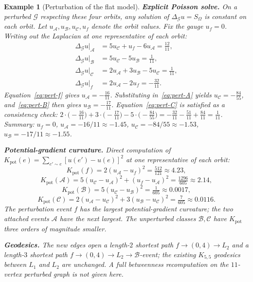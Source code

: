 \documentclass[12pt]{article}
\newtheorem{example}[theorem]{Example}
\newcommand{\Gcal}{\mathcal{G}}
\begin{document}
\begin{example}[Perturbation of the flat model]
\textbf{Explicit Poisson solve.} On a perturbed $\Gcal$ respecting these four orbits, any solution of $\Delta_\Gcal u = S_\Omega$ is constant on each orbit. Let $u_\mathcal{A}, u_\mathcal{B}, u_\mathcal{C}, u_f$ denote the orbit values. Fix the gauge $u_f = 0$. Writing out the Laplacian at one representative of each orbit:
\begin{align}
    \Delta_\Gcal u \big|_{\mathcal{A}} &= 5 u_\mathcal{C} + u_f - 6 u_\mathcal{A} = \tfrac{12}{11}, \label{eq:pert-A}\\
    \Delta_\Gcal u \big|_{\mathcal{B}} &= 5 u_\mathcal{C} - 5 u_\mathcal{B} = \tfrac{1}{11}, \label{eq:pert-B}\\
    \Delta_\Gcal u \big|_{\mathcal{C}} &= 2 u_\mathcal{A} + 3 u_\mathcal{B} - 5 u_\mathcal{C} = \tfrac{1}{11}, \label{eq:pert-C}\\
    \Delta_\Gcal u \big|_{f} &= 2 u_\mathcal{A} - 2 u_f = -\tfrac{32}{11}. \label{eq:pert-f}
\end{align}
Equation~\eqref{eq:pert-f} gives $u_\mathcal{A} = -\tfrac{16}{11}$. Substituting in~\eqref{eq:pert-A} yields $u_\mathcal{C} = -\tfrac{84}{55}$, and~\eqref{eq:pert-B} then gives $u_\mathcal{B} = -\tfrac{17}{11}$. Equation~\eqref{eq:pert-C} is satisfied as a consistency check: $2\cdot\bigl(-\tfrac{16}{11}\bigr) + 3\cdot\bigl(-\tfrac{17}{11}\bigr) - 5\cdot\bigl(-\tfrac{84}{55}\bigr) = -\tfrac{32}{11} - \tfrac{51}{11} + \tfrac{84}{11} = \tfrac{1}{11}$. Summary: $u_f = 0$, $u_\mathcal{A} = -16/11 \approx -1.45$, $u_\mathcal{C} = -84/55 \approx -1.53$, $u_\mathcal{B} = -17/11 \approx -1.55$.

\textbf{Potential-gradient curvature.} Direct computation of $K_{\mathrm{pot}}(e) = \sum_{e' \sim e} [u(e') - u(e)]^2$ at one representative of each orbit:
\[
    K_{\mathrm{pot}}(f) = 2 (u_\mathcal{A} - u_f)^2 = \tfrac{512}{121} \approx 4.23,
\]
\[
    K_{\mathrm{pot}}(\mathcal{A}) = 5 (u_\mathcal{C} - u_\mathcal{A})^2 + (u_f - u_\mathcal{A})^2 = \tfrac{1296}{605} \approx 2.14,
\]
\[
    K_{\mathrm{pot}}(\mathcal{B}) = 5 (u_\mathcal{C} - u_\mathcal{B})^2 = \tfrac{1}{605} \approx 0.0017,
\]
\[
    K_{\mathrm{pot}}(\mathcal{C}) = 2 (u_\mathcal{A} - u_\mathcal{C})^2 + 3 (u_\mathcal{B} - u_\mathcal{C})^2 = \tfrac{7}{605} \approx 0.0116.
\]
The perturbation event $f$ has the largest potential-gradient curvature; the two attached events $\mathcal{A}$ have the next largest. The unperturbed classes $\mathcal{B}, \mathcal{C}$ have $K_{\mathrm{pot}}$ three orders of magnitude smaller.

\textbf{Geodesics.} The new edges open a length-$2$ shortest path $f \to (0,4) \to L_2$ and a length-$3$ shortest path $f \to (0,4) \to L_2 \to \mathcal{B}$-event; the existing $K_{5,5}$ geodesics between $L_1$ and $L_2$ are unchanged. A full betweenness recomputation on the $11$-vertex perturbed graph is not given here.


\end{example}
\end{document}
